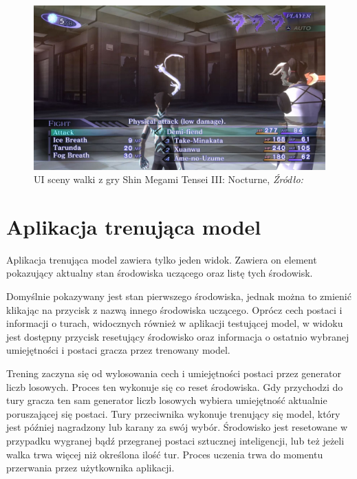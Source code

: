 \documentclass{SGGW-thesis}
\begin{document}
\begin{figure}[H]
  \includegraphics[width=1\textwidth]{smt3_screenshot.jpg}
  \caption{UI sceny walki z gry Shin Megami Tensei III: Nocturne, \textit{Źródło:~\cite{SMT3}}}
\end{figure}
\pagebreak
\section{Aplikacja trenująca model}
Aplikacja trenująca model zawiera tylko jeden widok. Zawiera on element pokazujący aktualny stan środowiska uczącego oraz listę tych środowisk. 

Domyślnie pokazywany jest stan pierwszego środowiska, jednak można to zmienić klikając na przycisk z nazwą innego środowiska uczącego. 
Oprócz cech postaci i informacji o turach, widocznych również w aplikacji testującej model, w widoku jest dostępny przycisk resetujący środowisko oraz informacja o ostatnio wybranej umiejętności i postaci gracza przez trenowany model.

Trening zaczyna się od wylosowania cech i umiejętności postaci przez generator liczb losowych. Proces ten wykonuje się co reset środowiska. Gdy przychodzi do tury gracza ten sam generator liczb losowych wybiera umiejętność aktualnie poruszającej się postaci.
Tury przeciwnika wykonuje trenujący się model, który jest później nagradzony lub karany za swój wybór.
Środowisko jest resetowane w przypadku wygranej bądź przegranej postaci sztucznej inteligencji, lub też jeżeli walka trwa więcej niż określona ilość tur. Proces uczenia trwa do momentu przerwania przez użytkownika aplikacji.
\end{document}
